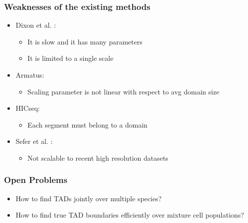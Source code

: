 \documentclass[12pt]{beamer}
\begin{document}
\begin{frame}
\frametitle{Weaknesses of the existing methods}

\begin{itemize}
\item Dixon et al. : 
\begin{itemize}
\item It is slow and it has many parameters 
\vspace{0.05cm}
\item It is limited to a single scale
\end{itemize}
\vspace{0.1cm}
\item Armatus:
\begin{itemize}
\item Scaling parameter is not linear with respect to avg domain size
\end{itemize}
\vspace{0.1cm}
\item HICseq:
\begin{itemize}
\item Each segment must belong to a domain
\end{itemize}
\vspace{0.1cm}
\item Sefer et al. :
\begin{itemize}
\item Not scalable to recent high resolution datasets
\end{itemize}

\end{itemize}

\end{frame}






\begin{frame}
\frametitle{Open Problems}

\begin{itemize}
\item How to find TADs jointly over multiple species?
\vspace{0.1cm}
\item How to find true TAD boundaries efficiently over mixture cell populations?
\end{itemize}

\end{frame}
\end{document}
